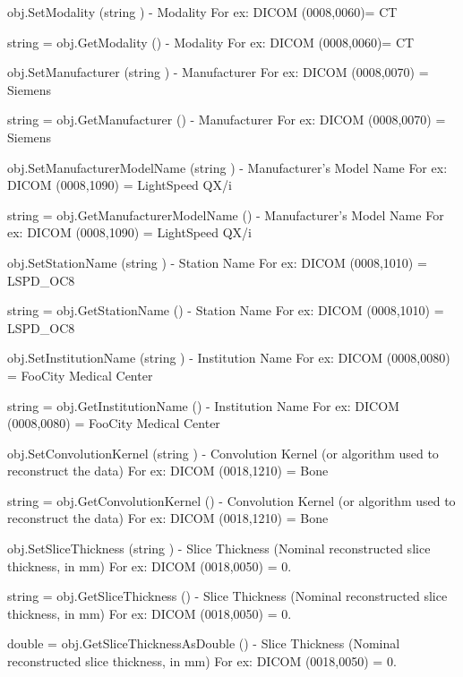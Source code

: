 \begin{DoxyItemize}
\item {\ttfamily obj.\-Set\-Modality (string )} -\/ Modality For ex\-: D\-I\-C\-O\-M (0008,0060)= C\-T  
\item {\ttfamily string = obj.\-Get\-Modality ()} -\/ Modality For ex\-: D\-I\-C\-O\-M (0008,0060)= C\-T  
\item {\ttfamily obj.\-Set\-Manufacturer (string )} -\/ Manufacturer For ex\-: D\-I\-C\-O\-M (0008,0070) = Siemens  
\item {\ttfamily string = obj.\-Get\-Manufacturer ()} -\/ Manufacturer For ex\-: D\-I\-C\-O\-M (0008,0070) = Siemens  
\item {\ttfamily obj.\-Set\-Manufacturer\-Model\-Name (string )} -\/ Manufacturer's Model Name For ex\-: D\-I\-C\-O\-M (0008,1090) = Light\-Speed Q\-X/i  
\item {\ttfamily string = obj.\-Get\-Manufacturer\-Model\-Name ()} -\/ Manufacturer's Model Name For ex\-: D\-I\-C\-O\-M (0008,1090) = Light\-Speed Q\-X/i  
\item {\ttfamily obj.\-Set\-Station\-Name (string )} -\/ Station Name For ex\-: D\-I\-C\-O\-M (0008,1010) = L\-S\-P\-D\-\_\-\-O\-C8  
\item {\ttfamily string = obj.\-Get\-Station\-Name ()} -\/ Station Name For ex\-: D\-I\-C\-O\-M (0008,1010) = L\-S\-P\-D\-\_\-\-O\-C8  
\item {\ttfamily obj.\-Set\-Institution\-Name (string )} -\/ Institution Name For ex\-: D\-I\-C\-O\-M (0008,0080) = Foo\-City Medical Center  
\item {\ttfamily string = obj.\-Get\-Institution\-Name ()} -\/ Institution Name For ex\-: D\-I\-C\-O\-M (0008,0080) = Foo\-City Medical Center  
\item {\ttfamily obj.\-Set\-Convolution\-Kernel (string )} -\/ Convolution Kernel (or algorithm used to reconstruct the data) For ex\-: D\-I\-C\-O\-M (0018,1210) = Bone  
\item {\ttfamily string = obj.\-Get\-Convolution\-Kernel ()} -\/ Convolution Kernel (or algorithm used to reconstruct the data) For ex\-: D\-I\-C\-O\-M (0018,1210) = Bone  
\item {\ttfamily obj.\-Set\-Slice\-Thickness (string )} -\/ Slice Thickness (Nominal reconstructed slice thickness, in mm) For ex\-: D\-I\-C\-O\-M (0018,0050) = 0.  
\item {\ttfamily string = obj.\-Get\-Slice\-Thickness ()} -\/ Slice Thickness (Nominal reconstructed slice thickness, in mm) For ex\-: D\-I\-C\-O\-M (0018,0050) = 0.  
\item {\ttfamily double = obj.\-Get\-Slice\-Thickness\-As\-Double ()} -\/ Slice Thickness (Nominal reconstructed slice thickness, in mm) For ex\-: D\-I\-C\-O\-M (0018,0050) = 0.  

\end{DoxyItemize}
